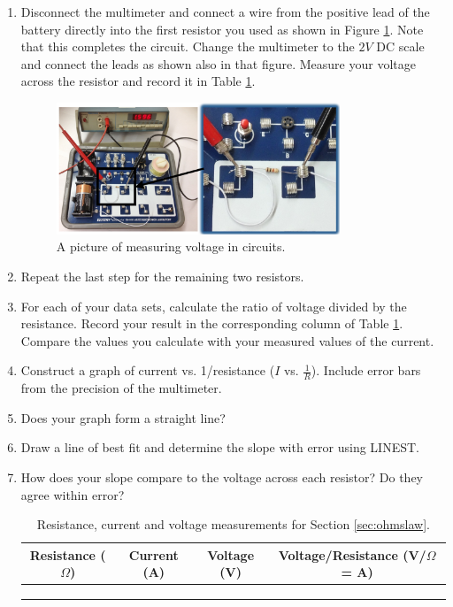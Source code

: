 \begin{enumerate}
	\item Disconnect the multimeter and connect a wire from the positive lead of the battery directly into the first resistor you used as shown in Figure \ref{fig:voltpic}. Note that this completes the circuit. Change the multimeter to the $2V$ DC scale and connect the leads as shown also in that figure. Measure your voltage across the resistor and record it in Table \ref{tab:ohmslaw}.

	\begin{figure}[h]
	\centering
	\includegraphics[width=0.8\textwidth]{./Exp2/pic/voltpic.png}
	\caption{A picture of measuring voltage in circuits.}
	\label{fig:voltpic}
	\end{figure}

	\item Repeat the last step for the remaining two resistors.

	\item For each of your data sets, calculate the ratio of voltage divided by the resistance. Record your result in the corresponding column of Table \ref{tab:ohmslaw}. Compare the values you calculate with your measured values of the current.

	\item Construct a graph of current vs. 1/resistance ($I$ vs. $\frac{1}{R}$). Include error bars from the precision of the multimeter.

	\item Does your graph form a straight line?

	\item Draw a line of best fit and determine the slope with error using LINEST.

	\item How does your slope compare to the voltage across each resistor? Do they agree within error?

\begin{table}
\begin{center}
\begin{tabular}{| c | c | c | c |}
\hline
	Resistance ($\Omega$) & Current (A) & Voltage (V) & Voltage/Resistance (V/$\Omega$ = A) \\
	\hline
	& & & \\
	\hline
	& & & \\
	\hline
	& & & \\
	\hline
\end{tabular}
\end{center}
\caption{Resistance, current and voltage measurements for Section \ref{sec:ohmslaw}.}
\label{tab:ohmslaw}
\end{table}

\end{enumerate}


